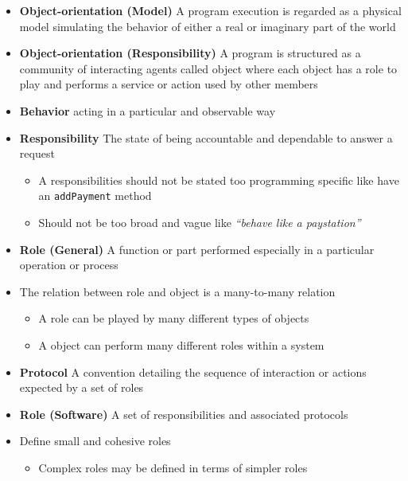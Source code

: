\documentclass[11pt]{article}
\providecommand{\tightlist}{%
      \setlength{\itemsep}{0pt}\setlength{\parskip}{0pt}}
\begin{document}
\begin{itemize}
\tightlist
\item
  \textbf{Object-orientation (Model)} A program execution is regarded as
  a physical model simulating the behavior of either a real or imaginary
  part of the world
\item
  \textbf{Object-orientation (Responsibility)} A program is structured
  as a community of interacting agents called object where each object
  has a role to play and performs a service or action used by other
  members
\item
  \textbf{Behavior} acting in a particular and observable way
\item
  \textbf{Responsibility} The state of being accountable and dependable
  to answer a request

  \begin{itemize}
  \tightlist
  \item
    A responsibilities should not be stated too programming specific
    like have an \texttt{addPayment} method
  \item
    Should not be too broad and vague like \emph{``behave like a
    paystation''}
  \end{itemize}
\item
  \textbf{Role (General)} A function or part performed especially in a
  particular operation or process
\item
  The relation between role and object is a many-to-many relation

  \begin{itemize}
  \tightlist
  \item
    A role can be played by many different types of objects
  \item
    A object can perform many different roles within a system
  \end{itemize}
\item
  \textbf{Protocol} A convention detailing the sequence of interaction
  or actions expected by a set of roles\\
\item
  \textbf{Role (Software)} A set of responsibilities and associated
  protocols
\item
  Define small and cohesive roles

  \begin{itemize}
  \tightlist
  \item
    Complex roles may be defined in terms of simpler roles
  \end{itemize}
\end{itemize}
\end{document}
